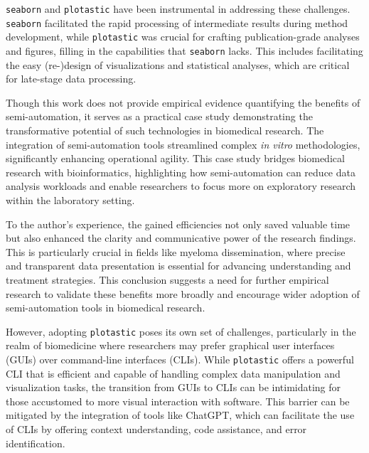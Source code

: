 \texttt{seaborn} and \texttt{plotastic} have been instrumental in addressing
these challenges. \texttt{seaborn} facilitated the rapid processing of
intermediate results during method development, while \texttt{plotastic} was
crucial for crafting publication-grade analyses and figures, filling in the
capabilities that \texttt{seaborn} lacks. This includes facilitating the easy
(re-)design of visualizations and statistical analyses, which are critical for
late-stage data processing.

Though this work does not provide empirical evidence quantifying the benefits of
semi-automation, it serves as a practical case study demonstrating the
transformative potential of such technologies in biomedical research. The
integration of semi-automation tools streamlined complex \textit{in vitro}
methodologies, significantly enhancing operational agility. This case study
bridges biomedical research with bioinformatics, highlighting how
semi-automation can reduce data analysis workloads and enable researchers to
focus more on exploratory research within the laboratory setting.

To the author's experience, the gained efficiencies not only saved valuable time
but also enhanced the clarity and communicative power of the research findings.
This is particularly crucial in fields like myeloma dissemination, where precise
and transparent data presentation is essential for advancing understanding and
treatment strategies. This conclusion suggests a need for further empirical
research to validate these benefits more broadly and encourage wider adoption of
semi-automation tools in biomedical research.

However, adopting \texttt{plotastic} poses its own set of challenges,
particularly in the realm of biomedicine where researchers may prefer graphical
user interfaces (GUIs) over command-line interfaces (CLIs). While
\texttt{plotastic} offers a powerful CLI that is efficient and capable of
handling complex data manipulation and visualization tasks, the transition from
GUIs to CLIs can be intimidating for those accustomed to more visual interaction
with software. This barrier can be mitigated by the integration of tools like
ChatGPT, which can facilitate the use of CLIs by offering context understanding,
code assistance, and error identification.





